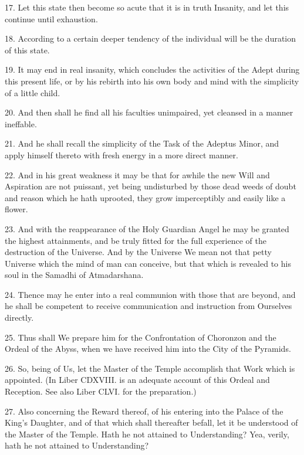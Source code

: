 17. Let this state then become so acute that it is in truth Insanity, and let this continue until exhaustion.

18. According to a certain deeper tendency of the individual will be the duration of this state.

19. It may end in real insanity, which concludes the activities of the Adept during this present life, or by his rebirth into his own body and mind with the simplicity of a little child.

20. And then shall he find all his faculties unimpaired, yet cleansed in a manner ineffable.

21. And he shall recall the simplicity of the Task of the Adeptus Minor, and apply himself thereto with fresh energy in a more direct manner.

22. And in his great weakness it may be that for awhile the new Will and Aspiration are not puissant, yet being undisturbed by those dead weeds of doubt and reason which he hath uprooted, they grow imperceptibly and easily like a flower.

23. And with the reappearance of the Holy Guardian Angel he may be granted the highest attainments, and be truly fitted for the full experience of the destruction of the Universe. And by the Universe We mean not that petty Universe which the mind of man can conceive, but that which is revealed to his soul in the Samadhi of Atmadarshana.

24. Thence may he enter into a real communion with those that are beyond, and he shall be competent to receive communication and instruction from Ourselves directly.

25. Thus shall We prepare him for the Confrontation of Choronzon and the Ordeal of the Abyss, when we have received him into the City of the Pyramids.

26. So, being of Us, let the Master of the Temple accomplish that Work which is appointed. (In Liber CDXVIII. is an adequate account of this Ordeal and Reception. See also Liber CLVI. for the preparation.)

27. Also concerning the Reward thereof, of his entering into the Palace of the King’s Daughter, and of that which shall thereafter befall, let it be understood of the Master of the Temple. Hath he not attained to Understanding? Yea, verily, hath he not attained to Understanding?

